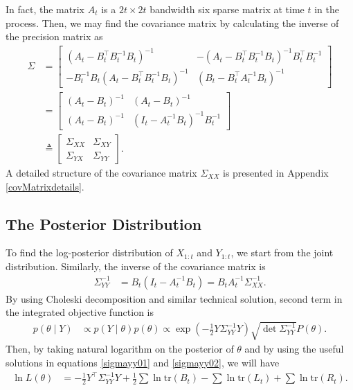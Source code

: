 In fact, the matrix $A_t$ is a $2t \times 2t$ bandwidth six sparse matrix at time $t$ in the process. Then, we may find the covariance matrix by calculating the inverse of the precision matrix as 
\begin{align*}
\Sigma &= \begin{bmatrix}
\left(A_t-B_t^\top B_t^{-1}B_t\right) ^{-1} & -\left(A_t-B_t^\top B_t^{-1}B_t\right)^{-1}B_t^\top B_t^{-1}\\
- B_t^{-1}B_t\left(A_t-B_t^\top B_t^{-1}B_t\right)^{-1} & \left(B_t-B_t^\top A_t^{-1}B_t\right) ^{-1}
\end{bmatrix} \\
&= \begin{bmatrix}
\left(A_t-B_t\right) ^{-1} & \left(A_t-B_t\right)^{-1}\\
\left(A_t-B_t\right)^{-1} & \left(I_t- A_t^{-1}B_t\right) ^{-1}B_t^{-1}
\end{bmatrix} \\
&\triangleq \begin{bmatrix}
\Sigma_{XX} & \Sigma_{XY} \\
\Sigma_{YX}  &\Sigma_{YY} 
\end{bmatrix}.
\end{align*}
A detailed structure of the covariance matrix $\Sigma_{XX} $ is presented in Appendix \ref{covMatrixdetails}. 

\subsection{The Posterior Distribution}

To find the log-posterior distribution of $X_{1:t}$ and $Y_{1:t}$, we start from the joint distribution. Similarly, the inverse of the covariance matrix is 
\begin{align*}
\Sigma_{YY}^{-1} &= B_t(I_t-A_t^{-1}B_t)= B_tA_t^{-1}\Sigma_{XX}^{-1}.
\end{align*}
By using Choleski decomposition and similar technical solution, second term in the integrated objective function is 
\begin{align*}
p(\theta \mid Y) &\propto p(Y\mid\theta)p(\theta) \propto \exp\left( -\frac{1}{2} Y \Sigma_{YY}^{-1} Y \right) \sqrt{\det \Sigma_{YY}^{-1}} P(\theta).
\end{align*}
Then, by taking natural logarithm on the posterior of $\theta$ and by using the useful solutions in equations \eqref{sigmayy01} and \eqref{sigmayy02}, we will have
\begin{align}\label{logL}
\ln L(\theta) &= -\frac{1}{2}Y^\top\Sigma_{YY}^{-1}Y+\frac{1}{2}\sum\ln\mbox{tr}(B_t)-\sum\ln\mbox{tr}(L_t)+\sum\ln\mbox{tr}(R_t).
\end{align}




